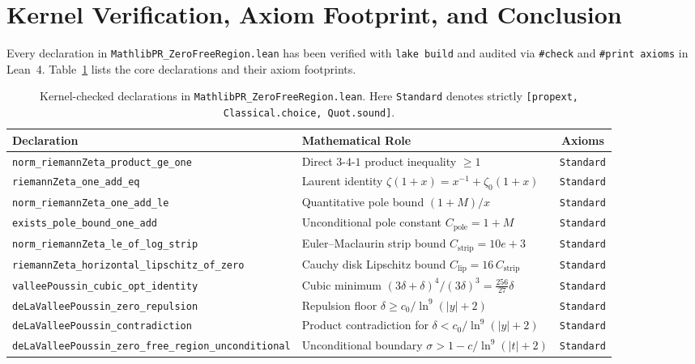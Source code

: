 \documentclass[11pt,a4paper]{article}
\theoremstyle{definition}
\begin{document}
\section{Kernel Verification, Axiom Footprint, and Conclusion}\label{sec:verification}

Every declaration in \texttt{MathlibPR\_ZeroFreeRegion.lean} has been verified with \texttt{lake build} and audited via \texttt{\#check} and \texttt{\#print axioms} in Lean~4. Table~\ref{tab:declarations} lists the core declarations and their axiom footprints.

\begin{table}[h!]
\centering
\footnotesize
\begin{tabular}{>{\raggedright\arraybackslash}p{6.1cm}p{5.8cm}c}
\toprule
\textbf{Declaration} & \textbf{Mathematical Role} & \textbf{Axioms} \\
\midrule
\texttt{norm\_riemannZeta\_\allowbreak product\_ge\_one} & Direct $3$-$4$-$1$ product inequality $\ge 1$ & \texttt{Standard} \\
\texttt{riemannZeta\_one\_add\_eq} & Laurent identity $\zeta(1+x) = x^{-1} + \zeta_0(1+x)$ & \texttt{Standard} \\
\texttt{norm\_riemannZeta\_one\_add\_le} & Quantitative pole bound $(1+M)/x$ & \texttt{Standard} \\
\texttt{exists\_pole\_bound\_one\_add} & Unconditional pole constant $C_{\text{pole}} = 1+M$ & \texttt{Standard} \\
\texttt{norm\_riemannZeta\_le\_of\_log\_strip} & Euler--Maclaurin strip bound $C_{\text{strip}} = 10e+3$ & \texttt{Standard} \\
\texttt{riemannZeta\_horizontal\_\allowbreak lipschitz\_of\_zero} & Cauchy disk Lipschitz bound $C_{\text{lip}} = 16\,C_{\text{strip}}$ & \texttt{Standard} \\
\texttt{valleePoussin\_cubic\_\allowbreak opt\_identity} & Cubic minimum $(3\delta+\delta)^4/(3\delta)^3 = \frac{256}{27}\delta$ & \texttt{Standard} \\
\texttt{deLaValleePoussin\_\allowbreak zero\_repulsion} & Repulsion floor $\delta \ge c_0 / \ln^9(|y|+2)$ & \texttt{Standard} \\
\texttt{deLaValleePoussin\_\allowbreak contradiction} & Product contradiction for $\delta < c_0/\ln^9(|y|+2)$ & \texttt{Standard} \\
\texttt{deLaValleePoussin\_\allowbreak zero\_free\_region\_\allowbreak unconditional} & Unconditional boundary $\sigma > 1 - c/\ln^9(|t|+2)$ & \texttt{Standard} \\
\bottomrule
\end{tabular}
\caption{Kernel-checked declarations in \texttt{MathlibPR\_ZeroFreeRegion.lean}. Here \texttt{Standard} denotes strictly \texttt{[propext, Classical.choice, Quot.sound]}.}
\label{tab:declarations}
\end{table}
\end{document}

